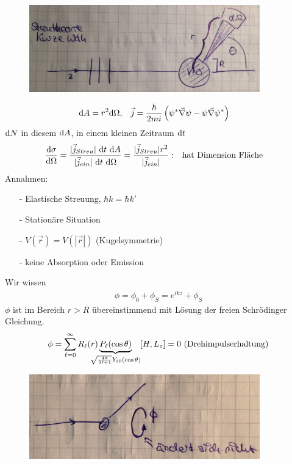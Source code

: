 	\begin{figure} [h]
		\begin{center}
			\includegraphics[width=10cm]{Stat_Streuproblem_Wirkungsquerschnitt7}
		\end{center}
	\end{figure}
		\begin{align*}
			\mathrm{d} A &= r^2 \mathrm{d} \Omega ,& 
			\vec{j} &= \frac{\hbar}{2 m i} \left(\psi^* \vec{\nabla} \psi - \psi \vec{\nabla} \psi^* \right)
		\end{align*}
	$\mathrm{d} N$ in diesem $\mathrm{d} A$, in einem kleinen Zeitraum $\mathrm{d} t$ 
		\begin{align*}
			\frac{\mathrm{d} \sigma}{\mathrm{d} \Omega}
			&= \frac{|\vec{j}_{Streu}| ~\mathrm{d} t ~ \mathrm{d} A}{ |\vec{j}_{ein}| ~\mathrm{d} t ~ \mathrm{d} \Omega}
			=\frac{|\vec{j}_{Streu}| r^2}{|\vec{j}_{ein}|} :&
			&\text{hat Dimension Fläche}
		\end{align*}
	Annahmen:
		\begin{itemize}
			\item[-] 	Elastische Streuung, $\hbar k = \hbar k'$
			\item[-]	Stationäre Situation
			\item[-]	$V(\vec{r}) = V(|\vec{r}|)$ (Kugelsymmetrie)
			\item[-]	keine Absorption oder Emission
		\end{itemize}
	Wir wissen
		\begin{align*}
			\phi = \phi_0 + \phi_S = e^{i k z} + \phi_S
		\end{align*}
	$\phi$ ist im Bereich $r>R$ übereinstimmend mit Lösung der freien Schrödinger Gleichung.
		\begin{align*}
			\phi = \sum_{\ell = 0}^{\infty} R_\ell (r) 
			\underbrace{P_\ell (\cos \theta)}_{\mathclap{\sqrt{\frac{4 \pi}{2\ell+1}} 
					Y_{\ell 0}(\cos \theta)}} 
			& &[H, L_z] = 0 ~(\text{Drehimpulserhaltung})
		\end{align*}	
	\begin{figure} [h]
		\begin{center}
			\includegraphics[width=10cm]{Stat_Streuproblem_Wirkungsquerschnitt8}
		\end{center}
	\end{figure}
